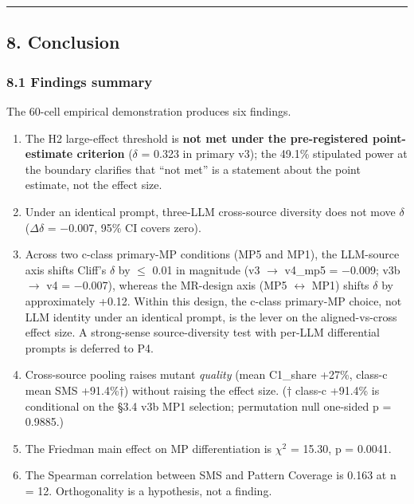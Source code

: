 \documentclass[review,12pt,authoryear]{elsarticle}
\begin{document}
\begin{center}\rule{0.5\linewidth}{0.5pt}\end{center}

\subsection{8. Conclusion}\label{conclusion}

\subsubsection{8.1 Findings summary}\label{findings-summary}

The 60-cell empirical demonstration produces six findings.

\begin{enumerate}
\def\labelenumi{(\roman{enumi})}
\item
  The H2 large-effect threshold is \textbf{not met under the
  pre-registered point-estimate criterion} ($\delta$ = 0.323 in primary v3);
  the 49.1\% stipulated power at the boundary clarifies that ``not met''
  is a statement about the point estimate, not the effect size.
\item
  Under an identical prompt, three-LLM cross-source diversity does not
  move $\delta$ ($\Delta$$\delta$ = −0.007, 95\% CI covers zero).
\item
  Across two c-class primary-MP conditions (MP5 and MP1), the LLM-source
  axis shifts Cliff's $\delta$ by $\leq$ 0.01 in magnitude (v3 $\to$ v4\_mp5 = −0.009;
  v3b $\to$ v4 = −0.007), whereas the MR-design axis (MP5 $\leftrightarrow$ MP1) shifts $\delta$ by
  approximately +0.12. Within this design, the c-class primary-MP
  choice, not LLM identity under an identical prompt, is the lever on
  the aligned-vs-cross effect size. A strong-sense source-diversity test
  with per-LLM differential prompts is deferred to P4.
\item
  Cross-source pooling raises mutant \emph{quality} (mean C1\_share
  +27\%, class-c mean SMS +91.4\%†) without raising the effect size. (†
  class-c +91.4\% is conditional on the §3.4 v3b MP1 selection;
  permutation null one-sided p = 0.9885.)
\item
  The Friedman main effect on MP differentiation is $\chi$$^{2}$ = 15.30, p =
  0.0041.
\item
  The Spearman correlation between SMS and Pattern Coverage is 0.163 at
  n = 12. Orthogonality is a hypothesis, not a finding.
\end{enumerate}
\end{document}
